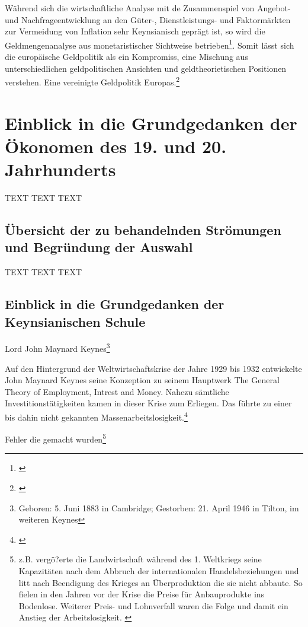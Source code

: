 \documentclass[
        onecolumn,
        a4paper,
        abstracton,
        parskip=half
        ,final
        ]{scrartcl}
\begin{document}
W{\"a}hrend sich die wirtschaftliche Analyse mit de Zusammenspiel von Angebot- und Nachfrageentwicklung an den G{\"u}ter-, Dienstleistungs- und Faktorm{\"a}rkten zur Vermeidung von Inflation sehr Keynsianisch gepr{\"a}gt ist, so wird die Geldmengenanalyse aus monetaristischer Sichtweise betrieben\footnote[97]{\citep[S.568]{Basseler2010}}. Somit l{\"a}sst sich die europ{\"a}ische Geldpolitik als ein Kompromiss, eine Mischung aus unterschiedlichen geldpolitischen Ansichten und geldtheorietischen Positionen verstehen. Eine vereinigte Geldpolitik Europas.\footnote[99]{\citep[vgl.][S.558f]{Basseler2010}}

\clearpage









\section{Einblick in die Grundgedanken der {\"O}konomen des 19. und 20. Jahrhunderts}
  \label{sec3:stroemungen}
  TEXT TEXT TEXT


\subsection{{\"U}bersicht der zu behandelnden Str{\"o}mungen und Begr{\"u}ndung der Auswahl} %

TEXT TEXT TEXT





\subsection{Einblick in die Grundgedanken der Keynsianischen Schule} %

Lord John Maynard Keynes\footnote[14]{Geboren:  5. Juni 1883 in Cambridge; Gestorben: 21. April 1946 in Tilton, im weiteren Keynes}

Auf den Hintergrund der Weltwirtschaftskrise der Jahre 1929 bis 1932 entwickelte John Maynard Keynes seine Konzeption zu seinem Hauptwerk \frqq The General Theory of Employment, Intrest and Money\flqq. Nahezu s{\"a}mtliche Investitionst{\"a}tigkeiten kamen in dieser Krise zum Erliegen. Das f{\"u}hrte zu einer bis dahin nicht gekannten Massenarbeitslosigkeit.\footnote[601]{\citep[S.203]{peters2000}}


 Fehler die gemacht wurden\footnote[602]{z.B.  verg{\"o}?erte die Landwirtschaft w{\"a}hrend des 1. Weltkriegs seine Kapazit{\"a}ten nach dem Abbruch der internationalen Handelsbeziehungen und litt nach Beendigung des Krieges an {\"U}berproduktion die sie nicht abbaute. So fielen in den Jahren vor der Krise die Preise f{\"u}r Anbauprodukte ins Bodenlose. Weiterer Preis- und Lohnverfall waren die Folge und damit ein Anstieg der Arbeitslosigkeit. \citep[vgl.][S.14ff]{bombach1981theorie}}
\end{document}
